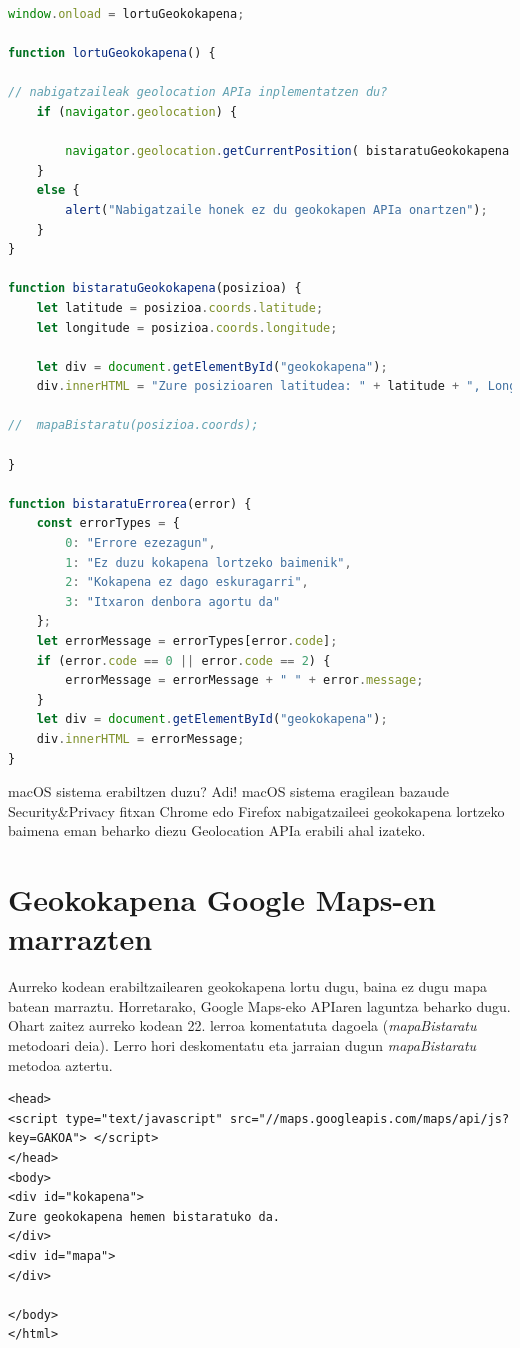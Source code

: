 \begin{lstlisting}[language=JavaScript]
window.onload = lortuGeokokapena;

function lortuGeokokapena() {

// nabigatzaileak geolocation APIa inplementatzen du?
	if (navigator.geolocation) {

		navigator.geolocation.getCurrentPosition( bistaratuGeokokapena , bistaratuErrorea);
	}
	else {
		alert("Nabigatzaile honek ez du geokokapen APIa onartzen");
	}
}

function bistaratuGeokokapena(posizioa) {
	let latitude = posizioa.coords.latitude;
	let longitude = posizioa.coords.longitude;

	let div = document.getElementById("geokokapena");
	div.innerHTML = "Zure posizioaren latitudea: " + latitude + ", Longitude: " + longitude;

//	mapaBistaratu(posizioa.coords);

}

function bistaratuErrorea(error) {
	const errorTypes = {
		0: "Errore ezezagun",
		1: "Ez duzu kokapena lortzeko baimenik",
		2: "Kokapena ez dago eskuragarri",
		3: "Itxaron denbora agortu da"
	};
	let errorMessage = errorTypes[error.code];
	if (error.code == 0 || error.code == 2) {
		errorMessage = errorMessage + " " + error.message;
	}
	let div = document.getElementById("geokokapena");
	div.innerHTML = errorMessage;
}
\end{lstlisting}

\begin{alertinfo}{macOS sistema erabiltzen duzu?}
Adi! macOS sistema eragilean bazaude Security\&Privacy fitxan Chrome edo Firefox nabigatzaileei geokokapena lortzeko baimena eman beharko diezu Geolocation APIa erabili ahal izateko.
\end{alertinfo}

\section{Geokokapena Google Maps-en marrazten}
Aurreko kodean erabiltzailearen geokokapena lortu dugu, baina ez dugu mapa batean marraztu. Horretarako, Google Maps-eko APIaren laguntza beharko dugu. Ohart zaitez aurreko kodean 22. lerroa komentatuta dagoela (\textit{mapaBistaratu} metodoari deia). Lerro hori deskomentatu eta jarraian dugun \textit{mapaBistaratu} metodoa aztertu. 

\begin{lstlisting}[language=HTML5]
<head>
<script type="text/javascript" src="//maps.googleapis.com/maps/api/js?key=GAKOA"> </script>
</head>
<body>
<div id="kokapena">
Zure geokokapena hemen bistaratuko da.
</div>
<div id="mapa">
</div>

</body>
</html>
\end{lstlisting}

